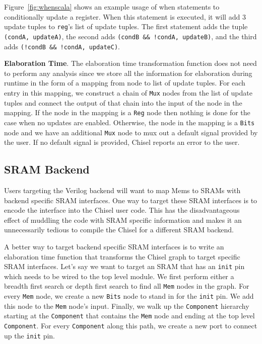 Figure~\ref{fig:whenscala} shows an example usage of when statements
to conditionally update a register. When this statement is executed,
it will add 3 update tuples to {\tt reg}'s list of update tuples. The
first statement adds the tuple {\tt (condA, updateA)}, the second adds
{\tt (condB \&\& !condA, updateB)}, and the third adds
{\tt (!condB \&\& !condA, updateC)}.

{\bf Elaboration Time}. The elaboration time transformation function
does not need to perform any analysis since we store all the
information for elaboration during runtime in the form of a mapping
from node to list of update tuples. For each entry in this mapping, we
construct a chain of {\tt Mux} nodes from the list of update tuples and
connect the output of that chain into the input of the node in the
mapping. If the node in the mapping is a {\tt Reg} node then nothing
is done for the case when no updates are enabled. Otherwise, the node
in the mapping is a {\tt Bits} node and we have an additional {\tt Mux}
node to mux out a default signal provided by the user. If no default
signal is provided, Chisel reports an error to the user.

\subsection{SRAM Backend}
Users targeting the Verilog backend will want to map Mems to SRAMs
with backend specific SRAM interfaces. One way to target these SRAM
interfaces is to encode the interface into the Chisel user code. This
has the disadvantageous effect of muddling the code with SRAM specific
information and makes it an unnecessarily tedious to compile the Chisel
for a different SRAM backend.

A better way to target backend specific SRAM interfaces is to write an
elaboration time function that transforms the Chisel graph to target
specific SRAM interfaces. Let's say we want to target an SRAM that has
an {\tt init} pin which needs to be wired to the top level module. We
first perform either a breadth first search or depth first search to
find all {\tt Mem} nodes in the graph. For every {\tt Mem} node, we
create a new {\tt Bits} node to stand in for the {\tt init} pin. We
add this node to the {\tt Mem} node's input. Finally, we walk up the
{\tt Component} hierarchy starting at the {\tt Component} that
contains the {\tt Mem} node and ending at the top level
{\tt Component}. For every {\tt Component} along this path, we create
a new port to connect up the {\tt init} pin.


